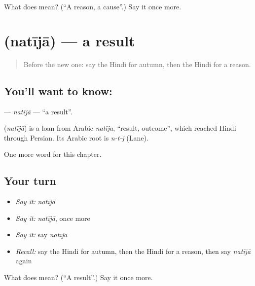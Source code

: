 \begin{tcolorbox}[breakable,colback=teal!4,colframe=teal!35!black,title={Before you move on}]
What does  mean? (\textquotedblleft{}A reason, a cause\textquotedblright{}.) Say it once more.
\end{tcolorbox}
\section[\texorpdfstring{\hi{नतीजा} (natījā)}{नतीजा (natījā)}]{ (natījā) — a result}

\label{lesson:HI-C222-natija}



\begin{quote}
Before the new one: say the Hindi for autumn, then the Hindi for a reason.
\end{quote}

\subsection*{You'll want to know: }
\textbf{} — \emph{natījā} — \textquotedblleft{}a result\textquotedblright{}.

\begin{cousinweb}
\textbf{} (\emph{natījā}) is a loan from Arabic \emph{natīja}, \textquotedblleft{}result, outcome\textquotedblright{}, which reached Hindi through Persian. Its Arabic root is \emph{n-t-j} (Lane).
\end{cousinweb}

\begin{grammarlens}[title={What you've built}]
One more word for this chapter.
\end{grammarlens}

\subsection*{Your turn}
\begin{itemize}
\raggedright
  \item \emph{Say it:} \emph{natījā}
  \item \emph{Say it:} \emph{natījā}, once more
  \item \emph{Say it:} say \emph{natījā}
  \item \emph{Recall:} say the Hindi for autumn, then the Hindi for a reason, then say \emph{natījā} again
\end{itemize}

\begin{tcolorbox}[breakable,colback=teal!4,colframe=teal!35!black,title={Before you move on}]
What does  mean? (\textquotedblleft{}A result\textquotedblright{}.) Say it once more.
\end{tcolorbox}
